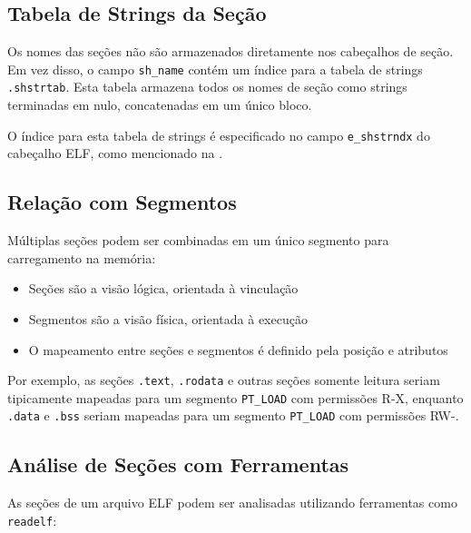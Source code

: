\subsection{Tabela de Strings da Seção}\label{subsec:shstrtab}

Os nomes das seções não são armazenados diretamente nos cabeçalhos de seção. Em vez disso, o campo \texttt{sh\_name} contém um índice para a tabela de strings \texttt{.shstrtab}. Esta tabela armazena todos os nomes de seção como strings terminadas em nulo, concatenadas em um único bloco.

O índice para esta tabela de strings é especificado no campo \texttt{e\_shstrndx} do cabeçalho ELF, como mencionado na .

\subsection{Relação com Segmentos}\label{subsec:sections_to_segments}

Múltiplas seções podem ser combinadas em um único segmento para carregamento na memória:

\begin{itemize}
    \item Seções são a visão lógica, orientada à vinculação
    \item Segmentos são a visão física, orientada à execução
    \item O mapeamento entre seções e segmentos é definido pela posição e atributos
\end{itemize}

Por exemplo, as seções \texttt{.text}, \texttt{.rodata} e outras seções somente leitura seriam tipicamente mapeadas para um segmento \texttt{PT\_LOAD} com permissões R-X, enquanto \texttt{.data} e \texttt{.bss} seriam mapeadas para um segmento \texttt{PT\_LOAD} com permissões RW-.

\subsection{Análise de Seções com Ferramentas}\label{subsec:section_analysis}

As seções de um arquivo ELF podem ser analisadas utilizando ferramentas como \texttt{readelf}:

